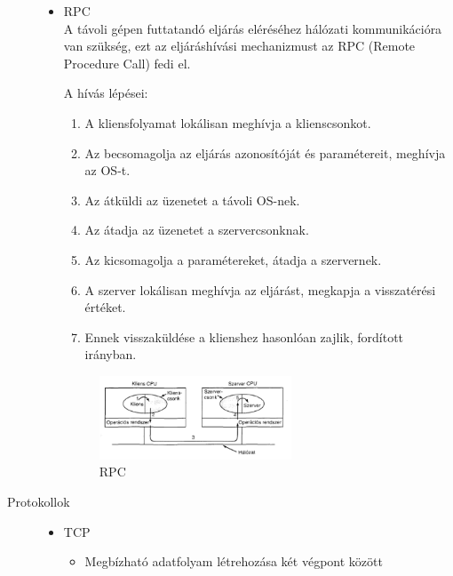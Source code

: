 \documentclass[margin=0px]{article}
\begin{document}
\begin{description}
\begin{itemize}
            \item RPC \\
                  A távoli gépen futtatandó eljárás eléréséhez hálózati kommunikációra van szükség, ezt az eljáráshívási mechanizmust az RPC (Remote Procedure Call) fedi el.

                  A hívás lépései:
                  \begin{enumerate}
                      \item A kliensfolyamat lokálisan meghívja a
                            klienscsonkot.
                      \item Az becsomagolja az eljárás azonosítóját
                            és paramétereit, meghívja az OS-t.
                      \item Az átküldi az üzenetet a távoli OS-nek.
                      \item Az átadja az üzenetet a
                            szervercsonknak.
                      \item Az kicsomagolja a paramétereket,
                            átadja a szervernek.
                      \item A szerver lokálisan meghívja az eljárást,
                            megkapja a visszatérési értéket.
                      \item Ennek visszaküldése a klienshez
                            hasonlóan zajlik, fordított irányban.
                  \end{enumerate}
                  \begin{figure}[H]
                      \centering
                      \includegraphics[width=0.6\textwidth]{img/rpc.png}
                      \caption{RPC}
                  \end{figure}
        \end{itemize}
    \item[Protokollok] \hfill
        \begin{itemize}
            \item TCP
                  \begin{itemize}
                      \item Megbízható adatfolyam létrehozása két végpont között

\end{itemize}
\end{itemize}
\end{description}
\end{document}
